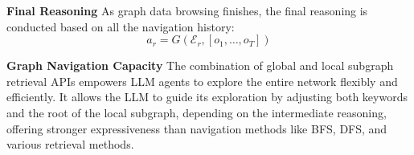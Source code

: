 \textbf{Final Reasoning} As graph data browsing finishes, the final reasoning is conducted based on all the navigation history:
$$a_r =G(\mathcal{E}_r, [o_1, \dots, o_{T}])$$

\textbf{Graph Navigation Capacity}
The combination of global and local subgraph retrieval APIs empowers LLM agents to explore the entire network flexibly and efficiently. It allows the LLM to guide its exploration by adjusting both keywords and the root of the local subgraph, depending on the intermediate reasoning, offering stronger expressiveness than navigation methods like BFS, DFS, and various retrieval methods.


